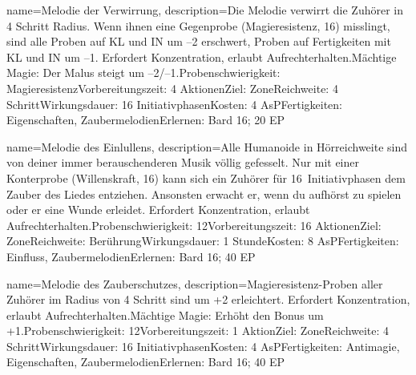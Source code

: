 {
    name={Melodie der Verwirrung},
    description={Die Melodie verwirrt die Zuhörer in 4 Schritt Radius. Wenn ihnen eine Gegenprobe (Magieresistenz, 16) misslingt, sind alle Proben auf KL und IN um –2 erschwert, Proben auf Fertigkeiten mit KL und IN um –1. Erfordert Konzentration, erlaubt Aufrechterhalten.\newline Mächtige Magie: Der Malus steigt um –2/–1.\newline Probenschwierigkeit: Magieresistenz\newline Vorbereitungszeit: 4 Aktionen\newline Ziel: Zone\newline Reichweite: 4 Schritt\newline Wirkungsdauer: 16 Initiativphasen\newline Kosten: 4 AsP\newline Fertigkeiten: Eigenschaften, Zaubermelodien\newline Erlernen: Bard 16; 20 EP}
}


{
    name={Melodie des Einlullens},
    description={Alle Humanoide in Hörreichweite sind von deiner immer berauschenderen Musik völlig gefesselt. Nur mit einer Konterprobe (Willenskraft, 16) kann sich ein Zuhörer für 16 Initiativphasen dem Zauber des Liedes entziehen. Ansonsten erwacht er, wenn du aufhörst zu spielen oder er eine Wunde erleidet. Erfordert Konzentration, erlaubt Aufrechterhalten.\newline Probenschwierigkeit: 12\newline Vorbereitungszeit: 16 Aktionen\newline Ziel: Zone\newline Reichweite: Berührung\newline Wirkungsdauer: 1 Stunde\newline Kosten: 8 AsP\newline Fertigkeiten: Einfluss, Zaubermelodien\newline Erlernen: Bard 16; 40 EP}
}


{
    name={Melodie des Zauberschutzes},
    description={Magieresistenz-Proben aller Zuhörer im Radius von 4 Schritt sind um +2 erleichtert. Erfordert Konzentration, erlaubt Aufrechterhalten.\newline Mächtige Magie: Erhöht den Bonus um +1.\newline Probenschwierigkeit: 12\newline Vorbereitungszeit: 1 Aktion\newline Ziel: Zone\newline Reichweite: 4 Schritt\newline Wirkungsdauer: 16 Initiativphasen\newline Kosten: 4 AsP\newline Fertigkeiten: Antimagie, Eigenschaften, Zaubermelodien\newline Erlernen: Bard 16; 40 EP}
}


